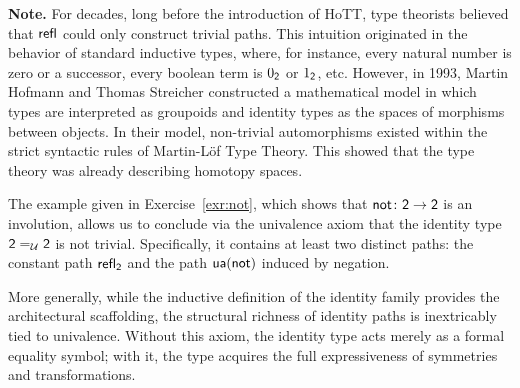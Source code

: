 {\small
\textbf{Note.} For decades, long before the introduction of HoTT, type theorists believed that $\mathsf{refl}$ could only construct trivial paths. This intuition originated in the behavior of standard inductive types, where, for instance, every natural number is zero or a successor,  every boolean term is $0_{\mathsf{2}}$ or $1_{\mathsf{2}}$, etc. However, in 1993, Martin Hofmann and Thomas Streicher constructed a mathematical model in which types are interpreted as groupoids and identity types as the spaces of morphisms between objects. In their model, non-trivial automorphisms existed within the strict syntactic rules of Martin-Löf Type Theory. This showed that the type theory was already describing homotopy spaces.

The example given in Exercise~\ref{exr:not}, which shows that $\fun{not}\colon\fun2\to\fun2$ is an involution, allows us to conclude via the univalence axiom that the identity type $\mathsf{2}\mathrel{=_{\mathcal U}}\mathsf{2}$ is not trivial. Specifically, it contains at least two distinct paths: the constant path $\mathsf{refl}_{\mathsf{2}}$ and the path $\mathsf{ua}(\mathsf{not})$ induced by negation.

More generally, while the inductive definition of the identity family provides the architectural scaffolding, the structural richness of identity paths is inextricably tied to univalence. Without this axiom, the identity type acts merely as a formal equality symbol; with it, the type acquires the full expressiveness of symmetries and transformations.
}

